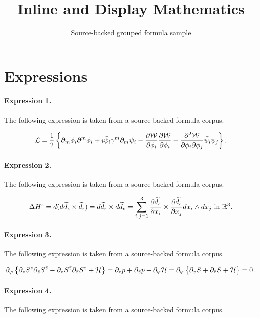 \documentclass[11pt]{article}
\title{Inline and Display Mathematics}
\author{Source-backed grouped formula sample}
\date{}
\begin{document}
\maketitle
\section{Expressions}
\paragraph{Expression 1.} The following expression is taken from a source-backed formula corpus.

\begin{align*}{\cal L} = \frac{1}{2} \left\{ \partial_{m}\phi_i \partial^{m}\phi_i + \imath\bar{\psi}_i \gamma^m \partial_m \psi_i - \frac{\partial {\cal W}}{\partial \phi_i}\frac{\partial {\cal W}}{\partial \phi_i} - \frac{\partial^2 {\cal W}}{\partial \phi_i\partial \phi_j} \bar{\psi}_i \psi_j \right\}.\end{align*}

\paragraph{Expression 2.} The following expression is taken from a source-backed formula corpus.

\begin{align*}\Delta H^\epsilon=d(d\widetilde d_\epsilon\times \widetilde d_\epsilon)=d\widetilde{d}_\epsilon\times d\widetilde{d}_\epsilon=\sum_{i,j=1}^3\frac{\partial \widetilde{d_\epsilon}}{\partial x_i}\times\frac{\partial \widetilde{d_\epsilon}}{\partial x_j} dx_i\wedge dx_j \ {\rm{in}}\ \mathbb R^3.\end{align*}

\paragraph{Expression 3.} The following expression is taken from a source-backed formula corpus.

\begin{align*}\partial_{\varphi}\left\{ \partial_zS^{z}\partial_{\bar{z}} S^{\bar{z}} - \partial_{z}S^{\bar{z}} \partial_{\bar{z}} S^z+{\cal{H}}\right\}=\partial_z p+\partial_{\bar{z}}\bar{p}+\partial_{\varphi}{\cal H}=\partial_{\varphi}\left\{\partial_z S+\partial_{\bar{z}} \bar{S}+{\cal H}\right\}=0\,.\end{align*}

\paragraph{Expression 4.} The following expression is taken from a source-backed formula corpus.
\end{document}
